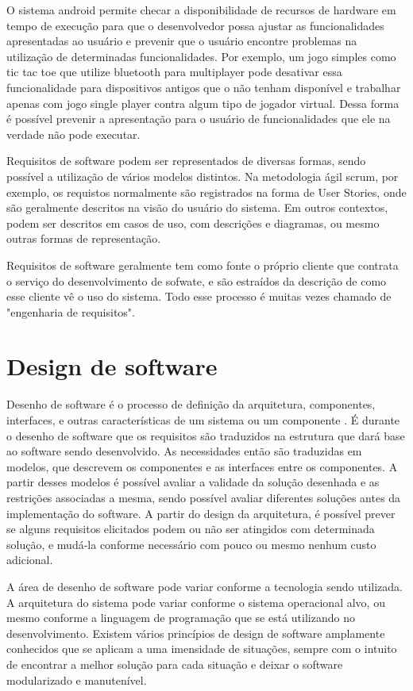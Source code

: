 O sistema android permite checar a disponibilidade de recursos de hardware em tempo de execução para que o desenvolvedor possa ajustar as funcionalidades apresentadas ao usuário e prevenir que o usuário encontre problemas na utilização de determinadas funcionalidades. Por exemplo, um jogo simples como tic tac toe que utilize bluetooth para multiplayer pode desativar essa funcionalidade para dispositivos antigos que o não tenham disponível e trabalhar apenas com jogo single player contra algum tipo de jogador virtual. Dessa forma é possível prevenir a apresentação para o usuário de funcionalidades que ele na verdade não pode executar.

Requisitos de software podem ser representados de diversas formas, sendo possível a utilização de vários modelos distintos. Na metodologia ágil scrum, por exemplo, os requistos normalmente são registrados na forma de User Stories, onde são geralmente descritos na visão do usuário do sistema. Em outros contextos, podem ser descritos em casos de uso, com descrições e diagramas, ou mesmo outras formas de representação.

Requisitos de software geralmente tem como fonte o próprio cliente que contrata o serviço do desenvolvimento de sofwate, e são estraídos da descrição de como esse cliente vê o uso do sistema. Todo esse processo é muitas vezes chamado de "engenharia de requisitos".

\section{Design de software}

Desenho de software é o processo de definição da arquitetura, componentes, interfaces, e outras características de um sistema ou um componente \cite{swebok}. É durante o desenho de software que os requisitos são traduzidos na estrutura que dará base ao software sendo desenvolvido. As necessidades então são traduzidas em modelos, que descrevem os componentes e as interfaces entre os componentes. A partir desses modelos é possível avaliar a validade da solução desenhada e as restrições associadas a mesma, sendo possível avaliar diferentes soluções antes da implementação do software. A partir do design da arquitetura, é possível prever se alguns requisitos elicitados podem ou não ser atingidos com determinada solução, e mudá-la conforme necessário com pouco ou mesmo nenhum custo adicional.

A área de desenho de software pode variar conforme a tecnologia sendo utilizada. A arquitetura do sistema pode variar conforme o sistema operacional alvo, ou mesmo conforme a linguagem de programação que se está utilizando no desenvolvimento. Existem vários princípios de design de software amplamente conhecidos que se aplicam a uma imensidade de situações, sempre com o intuito de encontrar a melhor solução para cada situação e deixar o software modularizado e manutenível.

